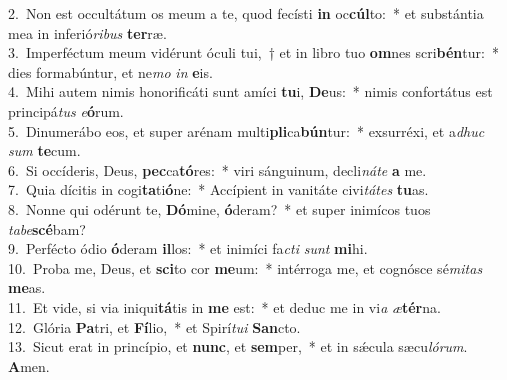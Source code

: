 {2.~}Non est occultátum os meum a te, quod fecísti \textbf{in} oc\textbf{cúl}to:~* et substántia mea in inferió\textit{ri}\textit{bus} \textbf{ter}ræ.\\
{3.~}Imperféctum meum vidérunt óculi tui,~† et in libro tuo \textbf{om}nes scri\textbf{bén}tur:~* dies formabúntur, et ne\textit{mo} \textit{in} \textbf{e}is.\\
{4.~}Mihi autem nimis honorificáti sunt amíci \textbf{tu}i, \textbf{De}us:~* nimis confortátus est principá\textit{tus} \textit{e}\textbf{ó}rum.\\
{5.~}Dinumerábo eos, et super arénam multi\textbf{pli}ca\textbf{bún}tur:~* exsurréxi, et a\textit{dhuc} \textit{sum} \textbf{te}cum.\\
{6.~}Si occíderis, Deus, \textbf{pec}ca\textbf{tó}res:~* viri sánguinum, decli\textit{ná}\textit{te} \textbf{a} me.\\
{7.~}Quia dícitis in cogi\textbf{ta}ti\textbf{ó}ne:~* Accípient in vanitáte civi\textit{tá}\textit{tes} \textbf{tu}as.\\
{8.~}Nonne qui odérunt te, \textbf{Dó}mine, \textbf{ó}deram?~* et super inimícos tuos \textit{ta}\textit{be}\textbf{scé}bam?\\
{9.~}Perfécto ódio \textbf{ó}deram \textbf{il}los:~* et inimíci fa\textit{cti} \textit{sunt} \textbf{mi}hi.\\
{10.~}Proba me, Deus, et \textbf{sci}to cor \textbf{me}um:~* intérroga me, et cognósce sé\textit{mi}\textit{tas} \textbf{me}as.\\
{11.~}Et vide, si via iniqui\textbf{tá}tis in \textbf{me} est:~* et deduc me in vi\textit{a} \textit{æ}\textbf{tér}na.\\
{12.~}Glória \textbf{Pa}tri, et \textbf{Fí}lio,~* et Spirí\textit{tu}\textit{i} \textbf{San}cto.\\
{13.~}Sicut erat in princípio, et \textbf{nunc}, et \textbf{sem}per,~* et in sǽcula sæcu\textit{ló}\textit{rum}. \textbf{A}men.\\

